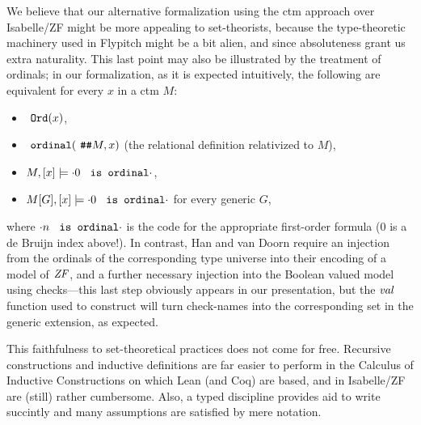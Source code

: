 We believe that our alternative formalization using the ctm approach
over Isabelle/ZF might be more appealing to set-theorists, because the
type-theoretic machinery used in Flypitch might be a bit alien, and
since absoluteness grant us extra naturality. This last point may also
be illustrated by the treatment of ordinals; in our formalization, as
it is expected intuitively, the following are equivalent for every $x$
in a ctm $M$:
\begin{itemize}
\item $\isatt{Ord}(x)$,
\item $\isatt{ordinal}(\isatt{\#\#}M,x)$ (the relational
  definition relativized to $M$),
\item
  $M,[x] \models {\cdot}0\isatt{ is ordinal}{\cdot}$,
\item
  $M[G], [x] \models {\cdot}0\isatt{ is ordinal}{\cdot}$ for every generic $G$,
\end{itemize}
where ${\cdot}n\isatt{ is ordinal}{\cdot}$ is the code for the
appropriate first-order formula  ($0$ is a de
Bruijn index above!). In contrast, Han and van Doorn require an
injection from the ordinals of the corresponding type universe into
their encoding of a model of $\mathit{ZF}$, and a further necessary injection into the Boolean
valued model using checks---this last step obviously appears in our
presentation, but the $\operatorname{\mathit{val}}$ function used to construct will turn
check-names into the corresponding set in the generic extension, as expected.

This faithfulness to set-theoretical practices does not come for
free. Recursive constructions and inductive definitions are far easier
to perform in the Calculus of Inductive Constructions on which Lean
(and Coq) are based, and in Isabelle/ZF are (still) rather
cumbersome. Also, a typed discipline provides aid to write succintly
and many assumptions are satisfied by mere notation.


